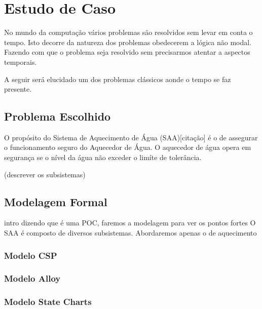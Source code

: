 \section{Estudo de Caso}
No mundo da computação vários problemas são resolvidos sem levar em conta o tempo. 
Isto decorre da natureza dos problemas obedecerem a lógica não modal. Fazendo com que o 
problema seja resolvido sem precisarmos atentar a aspectos temporais.

A seguir será elucidado um dos problemas clássicos aonde o tempo se faz presente.
\subsection{Problema Escolhido}
O propósito do Sistema de Aquecimento de Água (SAA)[citação] é o de assegurar o funcionamento 
seguro do Aquecedor de Água. O aquecedor de água opera em segurança se o nível da água
não exceder o limíte de tolerância.

(descrever os subsistemas)

\subsection{Modelagem Formal}
intro dizendo que é uma POC, faremos a modelagem para ver os pontos fortes
O SAA é composto de diversos subsistemas. Abordaremos apenas o de aquecimento
\subsubsection{Modelo CSP}
\subsubsection{Modelo Alloy}
\subsubsection{Modelo State Charts}
